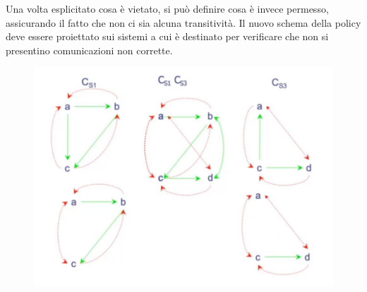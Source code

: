 Una volta esplicitato cosa è vietato, si può definire cosa è invece permesso,
assicurando il fatto
che non ci sia alcuna transitività.
Il nuovo schema della policy deve essere proiettato sui sistemi a cui è
destinato per verificare che
non si presentino comunicazioni non corrette.

\begin{figure}[H]
    \centering
    \includegraphics[width=12cm, keepaspectratio]{capitoli/policy/imgs/secure_regognition2.png}
\end{figure}
